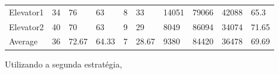\documentclass[a4paper]{article}
\begin{document}
\begin{table}[h]
\begin{tabular}{@{}llllllllll@{}}
Elevator1 & 34        & 76            & 63           & 8                                                               & 33                                                                  & 14051                                                         & 79066                                                 & 42088                                                   & 65.3        \\
Elevator2 & 40        & 70            & 63           & 9                                                               & 29                                                                  & 8049                                                         & 86094                                                 & 34074                                                   & 71.65         \\
Average   & 36     & 72.67         & 64.33        & 7                                                               & 28.67                                                               & 9380                                                         & 84420                                                 & 36478                                                   & 69.69          \\ \bottomrule
\end{tabular}
\end{table}

\newpage

Utilizando a segunda estratégia,
\end{document}
